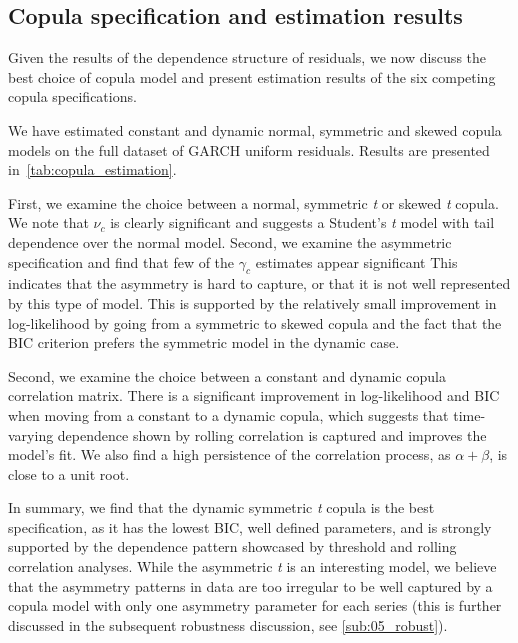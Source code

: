 \subsection{Copula specification and estimation results}
Given the results of the dependence structure of residuals, we now discuss the best choice of copula model and present estimation results of the six competing copula specifications.

We have estimated constant and dynamic normal, symmetric and skewed copula models on the full dataset of GARCH uniform residuals. Results are presented in~\autoref{tab:copula_estimation}. 

First, we examine the choice between a normal, symmetric \textit{t} or skewed \textit{t} copula. We note that $\nu_c$ is clearly significant and suggests a Student's \textit{t} model with tail dependence over the normal model. Second, we examine the asymmetric specification and find that few of the $\gamma_c$ estimates appear significant This indicates that the asymmetry is hard to capture, or that it is not well represented by this type of model. This is supported by the relatively small improvement in log-likelihood by going from a symmetric to skewed copula and the fact that the BIC criterion prefers the symmetric model in the dynamic case. 

Second, we examine the choice between a constant and dynamic copula correlation matrix. There is a significant improvement in log-likelihood and BIC when moving from a constant to a dynamic copula, which suggests that time-varying dependence shown by rolling correlation is captured and improves the model's fit. We also find a high persistence of the correlation process, as $\alpha + \beta$, is close to a unit root.

In summary, we find that the dynamic symmetric \emph{t} copula is the best specification, as it has the lowest BIC, well defined parameters, and is strongly supported by the dependence pattern showcased by threshold and rolling correlation analyses. While the asymmetric \emph{t} is an interesting model, we believe that the asymmetry patterns in data are too irregular to be well captured by a copula model with only one asymmetry parameter for each series (this is further discussed in the subsequent robustness discussion, see \autoref{sub:05_robust}).

